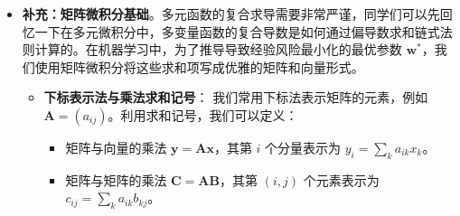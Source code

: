 \documentclass{article}
\theoremstyle{remark}
\theoremstyle{definition}
\theoremstyle{plain}
\numberwithin {equation}{section}
\numberwithin{assumption}{section}
\begin{document}
\begin{enumerate}
\begin{itemize}
\begin{itemize}
\begin{equation*}
            \end{equation*}
            这样，$\boldsymbol{X}^{\top} \boldsymbol{w}$ 就表示了包含了所有样本预测结果的 $N$ 维列向量。
            \item \textbf{第四步：向范数形式转换}。原风险公式的求和实际是所有真实值与预测值差值的平方和。我们可以将整体差值定义为误差向量 $\boldsymbol{e} = \boldsymbol{y} - \boldsymbol{X}^{\top} \boldsymbol{w}$。由于各项平方之和正是对应列向量与其自身的内积（即 $\ell_2$ 范数的平方）：
            \begin{equation*}
                \sum_{n=1}^N\left(y^{(n)}-\boldsymbol{w}^{\top} \boldsymbol{x}^{(n)}\right)^2 = \sum_{n=1}^N e_n^2 = \boldsymbol{e}^{\top}\boldsymbol{e} = \|\boldsymbol{e}\|^2
            \end{equation*}
        \end{itemize}
        经过上述详细拆解转换，经验风险就可以等价地表示为紧凑优美的矩阵范数形式：
        \begin{equation*}
        \mathcal{R}(\boldsymbol{w}) =\frac{1}{2}\left\|\boldsymbol{y}-\boldsymbol{X}^{\top} \boldsymbol{w}\right\|^2
        \end{equation*}

        \item \textbf{补充：矩阵微积分基础}。多元函数的复合求导需要非常严谨，同学们可以先回忆一下在多元微积分中，多变量函数的复合导数是如何通过偏导数求和链式法则计算的。在机器学习中，为了推导导致经验风险最小化的最优参数 $\boldsymbol{w}^*$，我们使用矩阵微积分将这些求和项写成优雅的矩阵和向量形式。

        \begin{itemize}
            \item \textbf{下标表示法与乘法求和记号}：
            我们常用下标法表示矩阵的元素，例如 $\boldsymbol{A} = (a_{ij})$。利用求和记号，我们可以定义：
            \begin{itemize}
                \item 矩阵与向量的乘法 $\boldsymbol{y} = \boldsymbol{A}\boldsymbol{x}$，其第 $i$ 个分量表示为 $y_i = \sum_{k} a_{ik} x_k$。
                \item 矩阵与矩阵的乘法 $\boldsymbol{C} = \boldsymbol{A}\boldsymbol{B}$，其第 $(i, j)$ 个元素表示为 $c_{ij} = \sum_{k} a_{ik} b_{kj}$。
            \end{itemize}


\end{itemize}
\end{itemize}
\end{enumerate}
\end{document}
